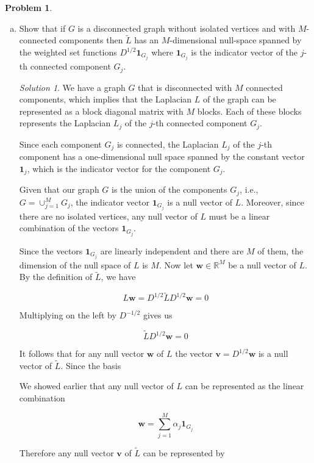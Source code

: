 \documentclass[12pt,a4paper]{article}
\theoremstyle{definition}
\newtheorem{problem}{Problem}
\theoremstyle{remark}
\newtheorem*{solution}{Solution}
\begin{document}
\begin{problem}
\begin{enumerate}[(a)]
        \item Show that if $G$ is a disconnected graph without isolated vertices and with $M$-connected components then $\tilde L$ has an $M$-dimensional null-space spanned by the weighted set functions $D^{1/2} \boldsymbol 1_{G_j}$ where $\boldsymbol 1_{G_j}$ is the indicator vector of the $j$-th connected component $G_j$.
        \begin{solution}
            We have a graph $G$ that is disconnected with $M$ connected components, which implies that the Laplacian $L$ of the graph can be represented as a block diagonal matrix with $M$ blocks. Each of these blocks represents the Laplacian $L_j$ of the $j$-th connected component $G_j$. 
            
            Since each component $G_j$ is connected, the Laplacian $L_j$ of the $j$-th component has a one-dimensional null space spanned by the constant vector $\boldsymbol 1_{j}$, which is the indicator vector for the component $G_j$.
            
            Given that our graph $G$ is the union of the components $G_j$, i.e., $G = \cup_{j=1}^{M} G_j$, the indicator vector $\boldsymbol 1_{G_j}$ is a null vector of $L$. Moreover, since there are no isolated vertices, any null vector of $L$ must be a linear combination of the vectors $\boldsymbol 1_{G_j}$.
            
            Since the vectors $\boldsymbol 1_{G_j}$ are linearly independent and there are $M$ of them, the dimension of the null space of $L$ is $M$. Now let $\mathbf w \in \mathbb R^M$ be a null vector of $L$. By the definition of $\tilde L$, we have 

            $$L \mathbf w = D^{1/2} \tilde L D^{1/2} \mathbf w = 0$$

            Multiplying on the left by $D^{-1/2}$ gives us 

            $$\tilde L D^{1/2} \mathbf w = 0$$

            It follows that for any null vector $\mathbf w$ of $L$ the vector $\mathbf v = D^{1/2} \mathbf w$ is a null vector of $\tilde L$. Since the basis 
            
            We showed earlier that any null vector of $L$ can be represented as the linear combination

            $$\mathbf w = \sum_{j=1}^M \alpha_j \boldsymbol 1_{G_j}$$

            Therefore any null vector $\mathbf v$ of $\tilde L$ can be represented by 


\end{solution}
\end{enumerate}
\end{problem}
\end{document}
